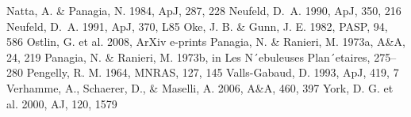 \documentclass[manuscript]{emulateapj}
\begin{document}
\begin{thebibliography}{32}
 Natta, A. \& Panagia, N. 1984, ApJ, 287, 228
 Neufeld, D.~A. 1990, ApJ, 350, 216
 Neufeld, D.~A. 1991, ApJ, 370, L85
 Oke, J. B. \& Gunn, J. E. 1982, PASP, 94, 586
 Ostlin, G. et al. 2008, ArXiv e-prints
 Panagia, N. \& Ranieri, M. 1973a, A\&A, 24, 219
 Panagia, N. \& Ranieri, M. 1973b, in Les N´ebuleuses Plan´etaires, 275–280
 Pengelly, R. M. 1964, MNRAS, 127, 145
 Valls-Gabaud, D. 1993, ApJ, 419, 7
 Verhamme, A., Schaerer, D., \& Maselli, A. 2006, A\&A, 460, 397
 York, D. G. et al. 2000, AJ, 120, 1579



\end{thebibliography}

\appendix
\end{document}
